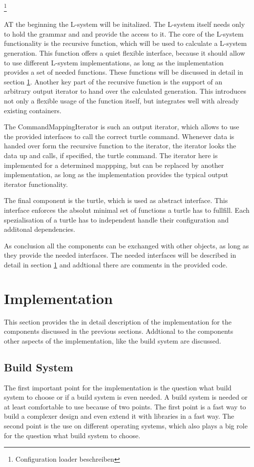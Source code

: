 \documentclass[english]{cpp-hmwk}
\begin{document}
\footnote{Configuration loader beschreiben}

AT the beginning the L-system will be initalized. The L-system itself needs only to hold the grammar and and provide the access to it. The core of the L-system functionality is the recursive function, which will be used to calculate a L-system generation. This function offers a quiet flexible interface, because it should allow to use different L-system implementations, as long as the implementation provides a set of needed functions. These functions will be discussed in detail in section \ref{section:impl}. 
Another key part of the recursive function is the support of an arbitrary output iterator to hand over the calculated generation. This introduces not only a flexible usage of the function itself, but integrates well with already existing containers. 

The CommandMappingIterator is such an output iterator, which allows to use the provided interfaces to call the correct turtle command. Whenever data is handed over form the recursive function to the iterator, the iterator looks the data up and calls, if specified, the turtle command. The iterator here is  implemented for a determined mappping, but can be replaced by another implementation, as long as the implementation provides the typical output iterator functionality.

The final component is the turtle, which is used as abstract interface. This interface enforces the absolut minimal set of functions a turtle has to fullfill. Each spezialisation of a turtle has to independent handle their configuration and additonal dependencies.

As conclusion all the components can be exchanged with other objects, as long as they provide the needed interfaces. The needed interfaces will be described in detail in section \ref{section:impl} and addtional there are comments in the provided code.

\pagebreak

\section{Implementation}
\label{section:impl}
This section provides the in detail description of the implementation for the components discussed in the previous sections. Addtional to the components other aspects of the implementation, like the build system are discussed.

\subsection{Build System}
\label{section:buildsystem}
The first important point for the implementation is the question what build system to choose or if a build system is even needed. A build system is needed or at least comfortable to use  because of two points. The first point is a fast way to build a complexer design and even extend it with libraries in a fast way. The second point is the use on different operating systems, which also plays a big role for the question what build system to choose.
 
\end{document}
